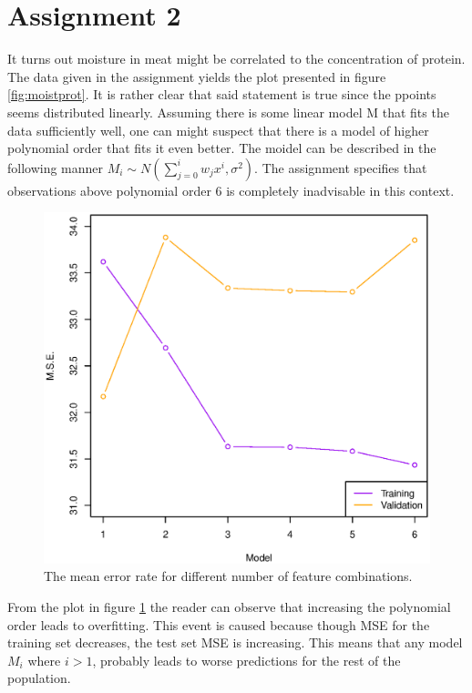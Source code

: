 \documentclass[a4paper, twocolumn]{article}
\begin{document}
    \section*{Assignment 2}
    It turns out moisture in meat might be correlated to the concentration of protein. The data given in the assignment yields the plot presented in figure \ref{fig:moistprot}. It is rather clear that said statement is true since the ppoints seems distributed linearly. Assuming there is some linear model M that fits the data sufficiently well, one can might suspect that there is a model of higher polynomial order that fits it even better. The moidel can be 
    described in the following manner \(M_i \sim N(\sum_{j=0}^{i} w_{j} x^{i},\sigma^2)\). The assignment specifies that observations above polynomial order 6 is completely inadvisable in this context.  

        \begin{figure}[H]
        \centering
        \begin{minipage}[]{0.5\textwidth}
        \includegraphics[width=\textwidth]{share/depends.eps}  
        \caption{The mean error rate for different number of feature combinations.\label{fig:depends} }
        \end{minipage}
        \end{figure}


        From the plot in figure \ref{fig:depends} the reader can observe that increasing the polynomial order leads to overfitting. This event is caused because though MSE for the training set decreases, the test set MSE is increasing. This means that any model \(M_i\) where $i > 1$, probably leads to worse predictions for the rest of the population.
\end{document}
